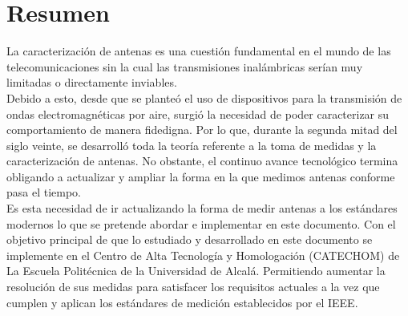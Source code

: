 \documentclass{article}
\begin{document}
\section{Resumen}

La caracterización de antenas es una cuestión fundamental en el mundo de las telecomunicaciones sin la cual las transmisiones inalámbricas serían muy limitadas o directamente inviables.\\
Debido a esto, desde que se planteó el uso de dispositivos para la transmisión de ondas electromagnéticas por aire, surgió la necesidad de poder caracterizar su comportamiento de manera fidedigna. Por lo que, durante la segunda mitad del siglo veinte, se desarrolló toda la teoría referente a la toma de medidas y la caracterización de antenas.
No obstante, el continuo avance tecnológico termina obligando a actualizar y ampliar la forma en la que medimos antenas conforme pasa el tiempo. \\


Es esta necesidad de ir actualizando la forma de medir antenas a los estándares modernos lo que se pretende abordar e implementar en este documento. Con el objetivo principal de que lo estudiado y desarrollado en este documento se implemente en el Centro de Alta Tecnología y Homologación (CATECHOM) de La Escuela Politécnica de la Universidad de Alcalá. Permitiendo aumentar la resolución de sus medidas para satisfacer los requisitos actuales a la vez que cumplen y aplican los estándares de medición establecidos por el IEEE. 
\end{document}
